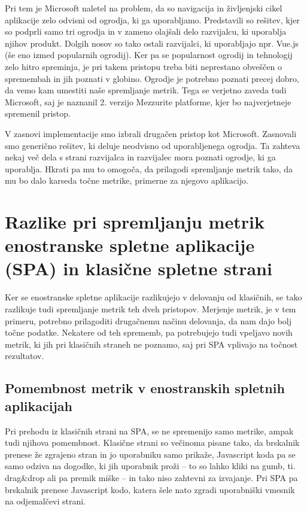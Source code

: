 \documentclass[a4paper, 12pt]{book}
\begin{document}
Pri tem je Microsoft naletel na problem, da so navigacija in življenjski cikel aplikacije zelo odvisni od ogrodja, ki ga uporabljamo. Predstavili so rešitev, kjer so podprli samo tri ogrodja in v zameno olajšali delo razvijalcu, ki uporablja njihov produkt. Dolgih nosov so tako ostali razvijalci, ki uporabljajo npr. Vue.js (še eno izmed popularnih ogrodij). Ker pa se popularnost ogrodij in tehnologij zelo hitro spreminja, je pri takem pristopu treba biti neprestano obveščen o spremembah in jih poznati v globino. Ogrodje je potrebno poznati  precej dobro, da vemo kam umestiti naše spremljanje metrik. Tega se verjetno zaveda tudi Microsoft, saj je naznanil 2. verzijo Mezzurite platforme, kjer bo najverjetneje spremenil pristop.

V zasnovi implementacije smo izbrali drugačen pristop kot Microsoft. Zasnovali smo generično rešitev, ki deluje neodvisno od uporabljenega ogrodja. Ta zahteva nekaj več dela s strani razvijalca in razvijalec mora poznati ogrodje, ki ga uporablja. Hkrati pa mu to omogoča, da prilagodi spremljanje metrik tako, da mu bo dalo karseda točne metrike, primerne za njegovo aplikacijo.

\chapter{Razlike pri spremljanju metrik enostranske spletne aplikacije (SPA) in klasične spletne strani}
\label{ch1}

Ker se enostranske spletne aplikacije razlikujejo v delovanju od klasičnih, se tako razlikuje tudi spremljanje metrik teh dveh pristopov. Merjenje metrik, je v tem primeru, potrebno prilagoditi drugačnemu načinu delovanja, da nam dajo bolj točne podatke. Nekatere od teh sprememb, pa potrebujejo tudi vpeljavo novih metrik, ki jih pri klasičnih straneh ne poznamo, saj pri SPA vplivajo na točnost rezultatov.

\section{Pomembnost metrik v enostranskih spletnih aplikacijah}

Pri prehodu iz klasičnih strani na SPA, se ne spremenijo samo metrike, ampak tudi njihova pomembnost. Klasične strani so večinoma pisane tako, da brskalnik prenese že zgrajeno stran in jo uporabniku samo prikaže, Javascript koda pa se samo odziva na dogodke, ki jih uporabnik proži – to so lahko kliki na gumb, ti. drag\&drop ali pa premik miške – in tako niso zahtevni za izvajanje. Pri SPA pa brskalnik prenese Javascript kodo, katera šele nato zgradi uporabniški vmesnik na odjemalčevi strani.
\end{document}
